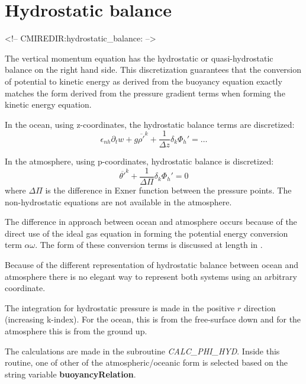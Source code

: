\section{Hydrostatic balance}
\begin{rawhtml}
<!-- CMIREDIR:hydrostatic_balance: -->
\end{rawhtml}

The vertical momentum equation has the hydrostatic or
quasi-hydrostatic balance on the right hand side. This discretization
guarantees that the conversion of potential to kinetic energy as
derived from the buoyancy equation exactly matches the form derived
from the pressure gradient terms when forming the kinetic energy
equation.

In the ocean, using z-coordinates, the hydrostatic balance terms are
discretized:
\begin{equation}
\epsilon_{nh} \partial_t w
+ g \overline{\rho'}^k + \frac{1}{\Delta z} \delta_k \Phi_h' = \ldots
\label{eq:discrete_hydro_ocean}
\end{equation}

In the atmosphere, using p-coordinates, hydrostatic balance is
discretized:
\begin{equation}
\overline{\theta'}^k + \frac{1}{\Delta \Pi} \delta_k \Phi_h' = 0
\label{eq:discrete_hydro_atmos}
\end{equation}
where $\Delta \Pi$ is the difference in Exner function between the
pressure points. The non-hydrostatic equations are not available in
the atmosphere.

The difference in approach between ocean and atmosphere occurs because
of the direct use of the ideal gas equation in forming the potential
energy conversion term $\alpha \omega$. The form of these conversion
terms is discussed at length in \cite{adcroft:02}.

Because of the different representation of hydrostatic balance between
ocean and atmosphere there is no elegant way to represent both systems
using an arbitrary coordinate.

The integration for hydrostatic pressure is made in the positive $r$
direction (increasing k-index). For the ocean, this is from the
free-surface down and for the atmosphere this is from the ground up.

The calculations are made in the subroutine {\em
CALC\_PHI\_HYD}. Inside this routine, one of other of the
atmospheric/oceanic form is selected based on the string variable {\bf
buoyancyRelation}.

